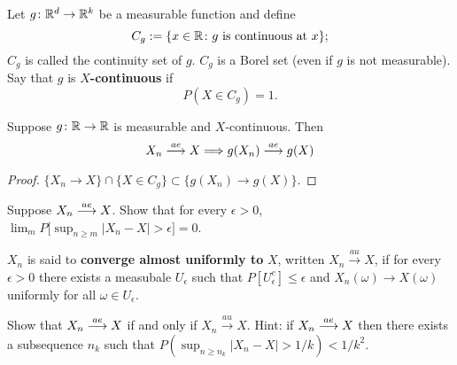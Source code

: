 \begin{definition}
Let $g\colon \Bbb R^d\rightarrow \Bbb R^k$ be a measurable function and define
\[ C_g:=\{ x\in\Bbb R\colon \text{$g$ is continuous at $x$}\}; \]
$C_g$ is called the continuity set of $g$. $C_g$ is a Borel set (even if $g$ is not measurable). Say that $g$ is {\bf $X$-continuous} if 
\[  P(X\in C_g)=1. \]
\end{definition}


\begin{theorem}
Suppose $g\colon\Bbb R\rightarrow\Bbb R$ is measurable and $X$-continuous. Then
\[X_n \overset{\small ae} \longrightarrow X \Longrightarrow g(X_n) \overset{\small ae} \longrightarrow g(X)\]
\end{theorem}
\begin{proof}$\{X_n \rightarrow X\} \cap \{ X\in C_g\} \subset \{g(X_n) \rightarrow g(X)\}$.
\end{proof}




\begin{exercise}
Suppose $X_n\overset{\small ae} \longrightarrow X$. Show that for every $\epsilon>0$, $\lim_m P\bigl[ \sup_{n\geq m} |X_n - X|>\epsilon \bigr]=0$.
\end{exercise}
\begin{exerciseproof}
\end{exerciseproof}

\begin{definition}
$X_n$ is said to {\bf converge almost uniformly to } $X$, written $X_n\overset{au}\longrightarrow X$, if for every $\epsilon>0$ there exists a measubale $U_\epsilon$ such that $P[U_\epsilon^c]\leq \epsilon$ and $X_n(\omega)\rightarrow X(\omega)$ uniformly for all $\omega \in U_\epsilon$. 
\end{definition}

\begin{exercise}
Show that $X_n\overset{\small ae} \longrightarrow X$ if and only if $X_n\overset{au}\longrightarrow X$. Hint: if $X_n\overset{\small ae} \longrightarrow X$ then there exists a subsequence $n_k$ such that $P(\sup_{n\geq n_k}|X_n - X|> 1/k)< 1/k^2$.
\end{exercise}








